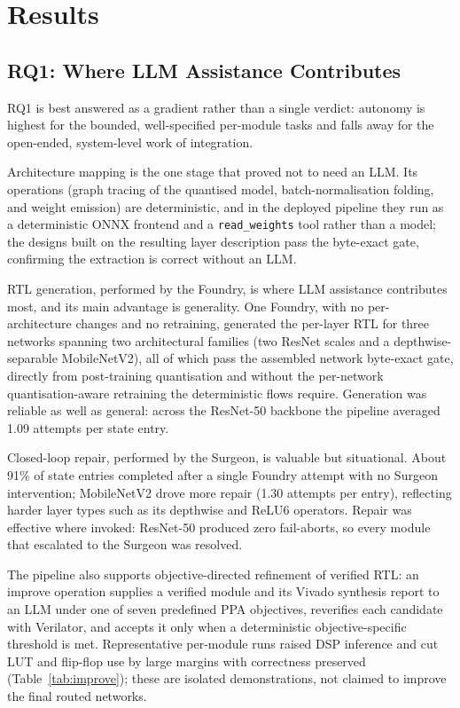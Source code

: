 \documentclass[acmtog,authorversion]{acmart}
\begin{document}
\section{Results}
\label{sec:results}

\subsection{RQ1: Where LLM Assistance Contributes}\label{sec:rq1}

RQ1 is best answered as a gradient rather than a single verdict: autonomy is highest for the bounded, well-specified per-module tasks and falls away for the open-ended, system-level work of integration.

Architecture mapping is the one stage that proved not to need an LLM. Its operations (graph tracing of the quantised model, batch-normalisation folding, and weight emission) are deterministic, and in the deployed pipeline they run as a deterministic ONNX frontend and a \texttt{read\_weights} tool rather than a model; the designs built on the resulting layer description pass the byte-exact gate, confirming the extraction is correct without an LLM.

RTL generation, performed by the Foundry, is where LLM assistance contributes most, and its main advantage is generality. One Foundry, with no per-architecture changes and no retraining, generated the per-layer RTL for three networks spanning two architectural families (two ResNet scales and a depthwise-separable MobileNetV2), all of which pass the assembled network byte-exact gate, directly from post-training quantisation and without the per-network quantisation-aware retraining the deterministic flows require. Generation was reliable as well as general: across the ResNet-50 backbone the pipeline averaged 1.09 attempts per state entry.

Closed-loop repair, performed by the Surgeon, is valuable but situational. About 91\% of state entries completed after a single Foundry attempt with no Surgeon intervention; MobileNetV2 drove more repair (1.30 attempts per entry), reflecting harder layer types such as its depthwise and ReLU6 operators. Repair was effective where invoked: ResNet-50 produced zero fail-aborts, so every module that escalated to the Surgeon was resolved.

The pipeline also supports objective-directed refinement of verified RTL: an improve operation supplies a verified module and its Vivado synthesis report to an LLM under one of seven predefined PPA objectives, reverifies each candidate with Verilator, and accepts it only when a deterministic objective-specific threshold is met. Representative per-module runs raised DSP inference and cut LUT and flip-flop use by large margins with correctness preserved (Table~\ref{tab:improve}); these are isolated demonstrations, not claimed to improve the final routed networks.
\end{document}

